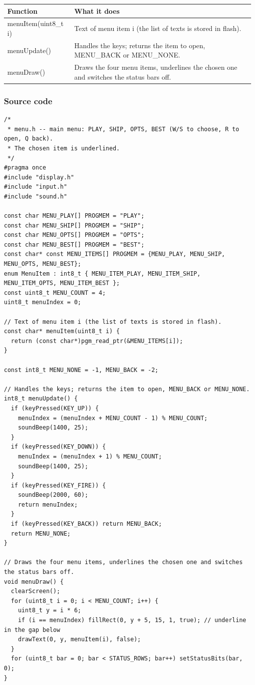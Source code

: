 \documentclass[11pt,a4paper]{article}
\begin{document}
\par\noindent\begin{minipage}{\linewidth}\centering\footnotesize
\begin{tabular}{|>{\raggedright\arraybackslash}p{5.82cm}|>{\raggedright\arraybackslash}p{10.68cm}|}
\hline\rowcolor{accent}\textbf{\color{white}Function} & \textbf{\color{white}What it does}\\\hline
menuItem(uint8\_t i) & Text of menu item i (the list of texts is stored in flash).\\\hline
\rowcolor{rowshade}menuUpdate() & Handles the keys; returns the item to open, MENU\_BACK or MENU\_NONE.\\\hline
menuDraw() & Draws the four menu items, underlines the chosen one and switches the status bars off.\\\hline
\end{tabular}
\end{minipage}\par\medskip

\subsubsection*{Source code}
\begin{lstlisting}[language=Arduino]
/*
 * menu.h -- main menu: PLAY, SHIP, OPTS, BEST (W/S to choose, R to open, Q back).
 * The chosen item is underlined.
 */
#pragma once
#include "display.h"
#include "input.h"
#include "sound.h"

const char MENU_PLAY[] PROGMEM = "PLAY";
const char MENU_SHIP[] PROGMEM = "SHIP";
const char MENU_OPTS[] PROGMEM = "OPTS";
const char MENU_BEST[] PROGMEM = "BEST";
const char* const MENU_ITEMS[] PROGMEM = {MENU_PLAY, MENU_SHIP, MENU_OPTS, MENU_BEST};
enum MenuItem : int8_t { MENU_ITEM_PLAY, MENU_ITEM_SHIP, MENU_ITEM_OPTS, MENU_ITEM_BEST };
const uint8_t MENU_COUNT = 4;
uint8_t menuIndex = 0;

// Text of menu item i (the list of texts is stored in flash).
const char* menuItem(uint8_t i) {
  return (const char*)pgm_read_ptr(&MENU_ITEMS[i]);
}

const int8_t MENU_NONE = -1, MENU_BACK = -2;

// Handles the keys; returns the item to open, MENU_BACK or MENU_NONE.
int8_t menuUpdate() {
  if (keyPressed(KEY_UP)) {
    menuIndex = (menuIndex + MENU_COUNT - 1) % MENU_COUNT;
    soundBeep(1400, 25);
  }
  if (keyPressed(KEY_DOWN)) {
    menuIndex = (menuIndex + 1) % MENU_COUNT;
    soundBeep(1400, 25);
  }
  if (keyPressed(KEY_FIRE)) {
    soundBeep(2000, 60);
    return menuIndex;
  }
  if (keyPressed(KEY_BACK)) return MENU_BACK;
  return MENU_NONE;
}

// Draws the four menu items, underlines the chosen one and switches the status bars off.
void menuDraw() {
  clearScreen();
  for (uint8_t i = 0; i < MENU_COUNT; i++) {
    uint8_t y = i * 6;
    if (i == menuIndex) fillRect(0, y + 5, 15, 1, true); // underline in the gap below
    drawText(0, y, menuItem(i), false);
  }
  for (uint8_t bar = 0; bar < STATUS_ROWS; bar++) setStatusBits(bar, 0);
}
\end{lstlisting}
\end{document}
